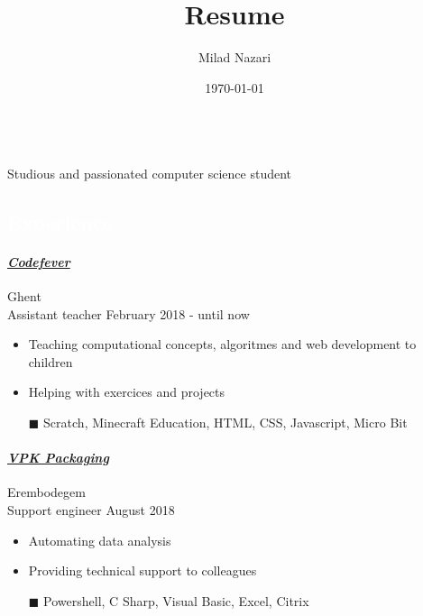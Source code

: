 \documentclass[a4paper, twoside]{article}
\title{Resume}
\author{ Milad Nazari }
\date{\today}
\begin{document}
\begin{multicols}{2}
\\
\noindent Studious and passionated computer science student
\paragraph{}
\hfill{}\par
\hfill{}\par
\hfill{}\par
\end{multicols}
\begin{mdframed}
\section*{\textcolor{white}{ Experience }}
\end{mdframed}
\paragraph{\textbf{\textit{\href{https://codefever.be }{\textcolor{blueDark}{ Codefever }}}}} \hfill\small Ghent \\
Assistant teacher \hfill\small
February 2018
- until now
\begin{itemize}
\itemsep-0.2em
\item Teaching computational concepts, algoritmes and web development to children
\item Helping with exercices and projects
\item[\color{orange}$\blacksquare$] Scratch, Minecraft Education, HTML, CSS, Javascript, Micro Bit
\end{itemize}
\paragraph{\textbf{\textit{\href{https://vpkgroup.com }{\textcolor{blueDark}{ VPK Packaging }}}}} \hfill\small Erembodegem \\
Support engineer \hfill\small
August 2018
\begin{itemize}
\itemsep-0.2em
\item Automating data analysis
\item Providing technical support to colleagues
\item[\color{orange}$\blacksquare$] Powershell, C Sharp, Visual Basic, Excel, Citrix
\end{itemize}
\end{document}
